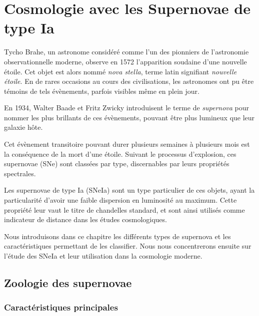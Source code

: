 \documentclass[../main/main.tex]{subfiles}
\begin{document}
\setcounter{chapter}{1}
\chapter{Cosmologie avec les Supernovae de type Ia}\label{ch:snia}

\minitoc
\vspace{2cm}

Tycho Brahe, un astronome considéré comme l'un des pionniers de l'astronomie
observationnelle moderne, observe en 1572 l'apparition soudaine d'une
nouvelle étoile. Cet objet est alors nommé \textit{nova stella}, terme latin
signifiant \textit{nouvelle étoile}. En de rares occasions au cours des
civilisations, les astronomes ont pu être témoins de tels évènements,
parfois visibles même en plein jour.

En 1934, Walter Baade et Fritz Zwicky introduisent le terme de
\textit{supernova} pour nommer les plus brillants de ces évènements,
pouvant être plus lumineux que leur galaxie hôte.

Cet évènement transitoire pouvant durer plusieurs semaines à plusieurs
mois est la conséquence de la mort d'une étoile. Suivant le processus
d'explosion, ces supernovae (SNe) sont classées par type, discernables
par leurs propriétés spectrales.

Les supernovae de type Ia (SNeIa) sont un type particulier de ces
objets, ayant la particularité d'avoir une faible dispersion en
luminosité au maximum. Cette propriété leur vaut le titre de chandelles standard,
et sont ainsi utilisés comme indicateur de distance dans les études
cosmologiques. 

Nous introduisons dans ce chapitre les différents types de supernova et
les caractéristiques permettant de les classifier. Nous nous
concentrerons ensuite sur l'étude des SNeIa et leur utilisation dans la
cosmologie moderne.

\newpage

\section{Zoologie des supernovae}

\subsection{Caractéristiques principales}
\end{document}
